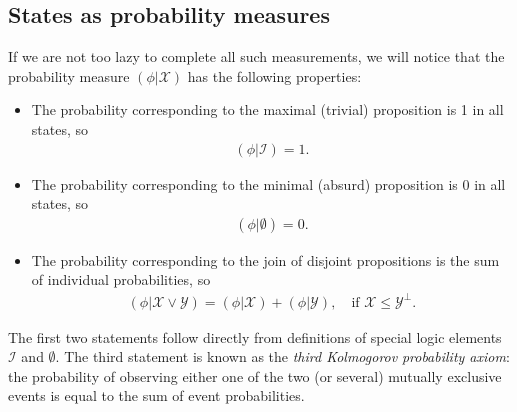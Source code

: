 \documentclass[nochecklpage]{stefan1}
\theoremstyle{definition}
\begin{document}
\subsection{States as probability measures}\label{sc:1.2.33}
If we are not too lazy to complete all such measurements, we will notice
that the probability measure $ (\phi | \mathcal{X}) $ has the following
properties:\label{lb:measure}
%
\begin{itemize}
\item  The probability corresponding to the maximal (trivial)
proposition is 1 in all states, so
\begin{align}
(\phi |\mathcal{I}) = 1. \label{eq:prob1}
\end{align}

\item  The probability corresponding to the minimal (absurd)
proposition is 0 in all states, so
\begin{align}
(\phi |\emptyset ) = 0. \label{eq:prob2}
\end{align}

\item  The probability corresponding to the join of disjoint
propositions is the sum of individual probabilities, so
\begin{align}
(\phi |\mathcal{X} \vee \mathcal{Y}) = (\phi |\mathcal{X}) + (\phi |
\mathcal{Y}), \quad \mbox{if } \mathcal{X} \leq \mathcal{Y}^{\perp }.
\label{eq:prob3}
\end{align}
\end{itemize}
%
The first two statements follow directly from definitions of special
logic elements $ \mathcal{I} $ and $ \emptyset $. The third statement
is known as the \emph{third Kolmogorov} \emph{probability axiom}: the
probability of observing either one of the two (or several) mutually
exclusive events is equal to the sum of event probabilities.

\end{document}

